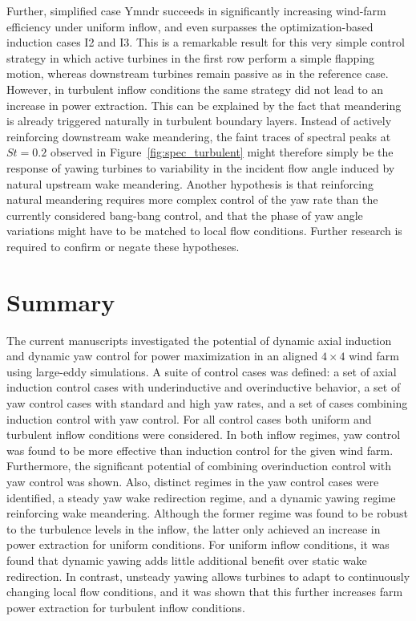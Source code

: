 \documentclass[energies,article,submit,moreauthors,latex,10pt,a4paper]{mdpi}
\begin{document}
Further, simplified case Ymndr succeeds in significantly increasing wind-farm efficiency under uniform inflow, and even surpasses the optimization-based induction cases I2 and I3. This is a remarkable result for this very simple control strategy in which active turbines in the first row perform a simple flapping motion, whereas downstream turbines remain passive as in the reference case. However, in turbulent inflow conditions the same strategy did not lead to an increase in power extraction. This can be explained by the fact that meandering is already triggered naturally in turbulent boundary layers. Instead of actively reinforcing downstream wake meandering, the faint traces of spectral peaks at $St = 0.2$ observed in Figure~\ref{fig:spec_turbulent} might therefore simply be the response of yawing turbines to variability in the incident flow angle induced by natural upstream wake meandering. Another hypothesis is that reinforcing natural meandering requires more complex control of the yaw rate than the currently considered bang-bang control, and that the phase of yaw angle variations might have to be matched to local flow conditions. Further research is required to confirm or negate these hypotheses.



\section{Summary} \label{sec:opt_yaw_concl}
\noindent The current manuscripts investigated the potential of dynamic axial induction and dynamic yaw control for power maximization in an aligned $4 \times 4$ wind farm using large-eddy simulations. A suite of control cases was defined: a set of axial induction control cases with underinductive and overinductive behavior, a set of yaw control cases with standard and high yaw rates, and a set of cases combining induction control with yaw control. For all control cases both uniform and turbulent inflow conditions were considered. In both inflow regimes, yaw control was found to be more effective than induction control for the given wind farm. Furthermore, the significant potential of combining overinduction control with yaw control was shown. Also, distinct regimes in the yaw control cases were identified, a steady yaw wake redirection regime, and a dynamic yawing regime reinforcing wake meandering. Although the former regime was found to be robust to the turbulence levels in the inflow, the latter only achieved an increase in power extraction for uniform conditions. For uniform inflow conditions, it was found that dynamic yawing adds little additional benefit over static wake redirection. In contrast, unsteady yawing allows turbines to adapt to continuously changing local flow conditions, and it was shown that this further increases farm power extraction for turbulent inflow conditions. 
\end{document}
